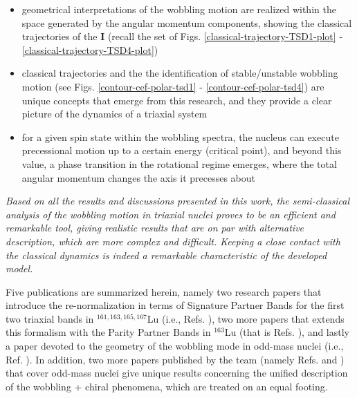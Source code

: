 \begin{itemize}
    \item geometrical interpretations of the wobbling motion are realized within the space generated by the angular momentum components, showing the classical trajectories of the $\mathbf{I}$ (recall the set of Figs. \ref{classical-trajectory-TSD1-plot} - \ref{classical-trajectory-TSD4-plot})
    \item classical trajectories and the the identification of stable/unstable wobbling motion (see Figs. \ref{contour-cef-polar-tsd1} - \ref{contour-cef-polar-tsd4}) are unique concepts that emerge from this research, and they provide a clear picture of the dynamics of a triaxial system
    \item for a given spin state within the wobbling spectra, the nucleus can execute precessional motion up to a certain energy (critical point), and beyond this value, a phase transition in the rotational regime emerges, where the total angular momentum changes the axis it precesses about
\end{itemize}

\emph{Based on all the results and discussions presented in this work, the semi-classical analysis of the wobbling motion in triaxial nuclei proves to be an efficient and remarkable tool, giving realistic results that are on par with alternative description, which are more complex and difficult. Keeping a close contact with the classical dynamics is indeed a remarkable characteristic of the developed model.}

Five publications are summarized herein, namely two research papers that introduce the re-normalization in terms of Signature Partner Bands for the first two triaxial bands in $^{161,163,165,167}$Lu (i.e., Refs. \cite{raduta2020approach,raduta2020towards}), two more papers that extends this formalism with the Parity Partner Bands in $^{163}$Lu (that is Refs. \cite{poenaru2021parity,poenaru2021extensive1}), and lastly a paper devoted to the geometry of the wobbling mode in odd-mass nuclei (i.e., Ref. \cite{poenaru2021extensive2}). In addition, two more papers published by the team (namely Refs. \cite{raduta2020new} and \cite{raduta2022simultaneous}) that cover odd-mass nuclei give unique results concerning the unified description of the wobbling + chiral phenomena, which are treated on an equal footing.
